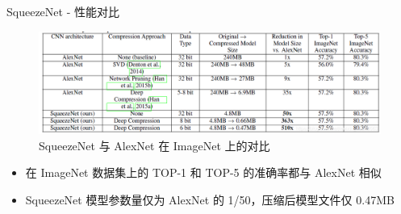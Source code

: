 \documentclass{beamer}
\begin{document}
\begin{frame}{SqueezeNet - 性能对比}
    \begin{figure}
        \centering
        \includegraphics[width=0.8\linewidth]{pic/squeezenet_vs_alexnet.png}
        \caption{SqueezeNet 与 AlexNet 在 ImageNet 上的对比}
    \end{figure}
    
    \begin{itemize}
        \item 在 ImageNet 数据集上的 TOP-1 和 TOP-5 的准确率都与 AlexNet 相似
        \item SqueezeNet 模型参数量仅为 AlexNet 的 1/50，压缩后模型文件仅 0.47MB
    \end{itemize}
\end{frame}

\end{document}
